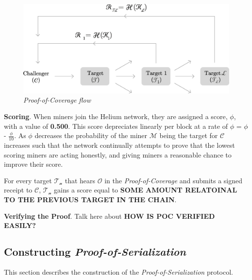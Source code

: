 \documentclass[letterpaper,11pt]{article}
\def\proofofcoverage/{\textit{Proof-of-Coverage}}
\begin{document}
\begin{figure}[H]
	\begin{center}
  		\includegraphics[width=\textwidth]{diagram4.eps}
  		\caption{\textit{\proofofcoverage/ flow}}
  		\label{fig:poc-flow}
 	\end{center}
\end{figure}

\textbf{Scoring}. \label{scores} When miners join the Helium network, they are assigned a score, $\mathcal{\phi}$, with a value of \textbf{0.500}. This score depreciates linearly per block at a rate of $\mathcal{\phi}$ = $\mathcal{\phi}$ - \(\frac{\phi}{10}\). As $\mathcal{\phi}$ decreases the probability of the miner $\mathcal{M}$ being the target for $\mathcal{C}$ increases such that the network continually attempts to prove that the lowest scoring miners are acting honestly, and giving miners a reasonable chance to improve their score.\newline

For every target $\mathcal{T_n}$ that hears $\mathcal{O}$ in the \proofofcoverage/ and submits a signed receipt to $\mathcal{C}$, $\mathcal{T_n}$ gains a score equal to \textbf{SOME AMOUNT RELATOINAL TO THE PREVIOUS TARGET IN THE CHAIN}.\newline

\textbf{Verifying the Proof}. Talk here about \textbf{HOW IS POC VERIFIED EASILY?}

\subsection{Constructing \textit{Proof-of-Serialization}}

This section describes the construction of the \textit{Proof-of-Serialization} protocol.\newline
\end{document}
